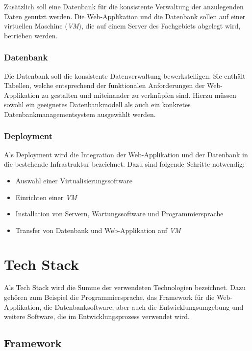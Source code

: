 \documentclass[
]{article}
\providecommand{\tightlist}{%
  \setlength{\itemsep}{0pt}\setlength{\parskip}{0pt}}
\begin{document}
Zusätzlich soll eine Datenbank für die konsistente Verwaltung der anzulegenden Daten genutzt werden. Die Web-Applikation und die Datenbank sollen auf einer virtuellen Maschine (\emph{VM}), die auf einem Server des Fachgebiets abgelegt wird, betrieben werden.

\hypertarget{datenbank}{%
\subsubsection{Datenbank}\label{datenbank}}

Die Datenbank soll die konsistente Datenverwaltung bewerkstelligen. Sie enthält Tabellen, welche entsprechend der funktionalen Anforderungen der Web-Applikation zu gestalten und miteinander zu verknüpfen sind. Hierzu müssen sowohl ein geeignetes Datenbankmodell als auch ein konkretes Datenbankmanagementsystem ausgewählt werden.

\hypertarget{deployment}{%
\subsubsection{Deployment}\label{deployment}}

Als Deployment wird die Integration der Web-Applikation und der Datenbank in die bestehende Infrastruktur bezeichnet. Dazu sind folgende Schritte notwendig:

\begin{itemize}
\tightlist
\item
  Auswahl einer Virtualisierungssoftware
\item
  Einrichten einer \emph{VM}
\item
  Installation von Servern, Wartungssoftware und Programmiersprache
\item
  Transfer von Datenbank und Web-Applikation auf \emph{VM}
\end{itemize}

\hypertarget{tech-stack}{%
\section{Tech Stack}\label{tech-stack}}

Als Tech Stack wird die Summe der verwendeten Technologien bezeichnet. Dazu gehören zum Beispiel die Programmiersprache, das Framework für die Web-Applikation, die Datenbanksoftware, aber auch die Entwicklungsumgebung und weitere Software, die im Entwicklungsprozess verwendet wird.\autocite{techstack}

\hypertarget{framework}{%
\subsection{Framework}\label{framework}}
\end{document}
